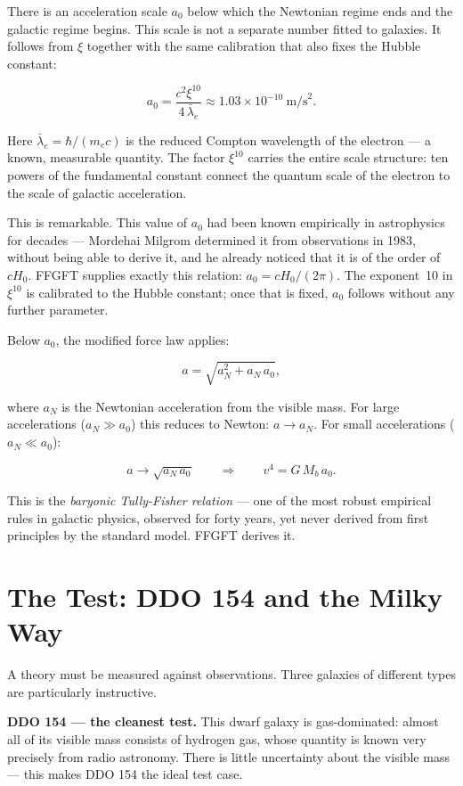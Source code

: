 \documentclass[11pt,oneside]{book}
\begin{document}
There is an acceleration scale $a_0$ below which the
Newtonian regime ends and the galactic regime begins.
This scale is not a separate number fitted to galaxies. It
follows from $\xi$ together with the same calibration that also
fixes the Hubble constant:

\[
  a_0 = \frac{c^2 \xi^{10}}{4\,\bar{\lambda}_e}
    \approx 1{.}03 \times 10^{-10}~\text{m/s}^2 .
\]

Here $\bar{\lambda}_e = \hbar/(m_e c)$ is the reduced
Compton wavelength of the electron — a known, measurable
quantity. The factor $\xi^{10}$ carries the entire scale
structure: ten powers of the fundamental constant connect
the quantum scale of the electron to the scale of galactic
acceleration.

This is remarkable. This value of $a_0$ had been known
empirically in astrophysics for decades — Mordehai Milgrom
determined it from observations in 1983, without being able
to derive it, and he already noticed that it is of the order
of $cH_0$. FFGFT supplies exactly this relation:
$a_0 = cH_0/(2\pi)$. The exponent~10 in $\xi^{10}$ is calibrated
to the Hubble constant; once that is fixed, $a_0$ follows
without any further parameter.

Below $a_0$, the modified force law applies:

\[
  a = \sqrt{a_N^2 + a_N\,a_0} ,
\]

where $a_N$ is the Newtonian acceleration from the visible
mass. For large accelerations ($a_N \gg a_0$) this reduces
to Newton: $a \to a_N$. For small accelerations
($a_N \ll a_0$):

\[
  a \to \sqrt{a_N\,a_0} \qquad\Longrightarrow\qquad
  v^4 = G\,M_b\,a_0 .
\]

This is the \emph{baryonic Tully-Fisher relation} — one of
the most robust empirical rules in galactic physics,
observed for forty years, yet never derived from first
principles by the standard model. FFGFT derives it.

\chapter{The Test: DDO 154 and the Milky Way}

A theory must be measured against observations. Three
galaxies of different types are particularly instructive.

\textbf{DDO 154 — the cleanest test.}
This dwarf galaxy is gas-dominated: almost all of its
visible mass consists of hydrogen gas, whose quantity is
known very precisely from radio astronomy. There is little
uncertainty about the visible mass — this makes DDO 154
the ideal test case.
\end{document}
